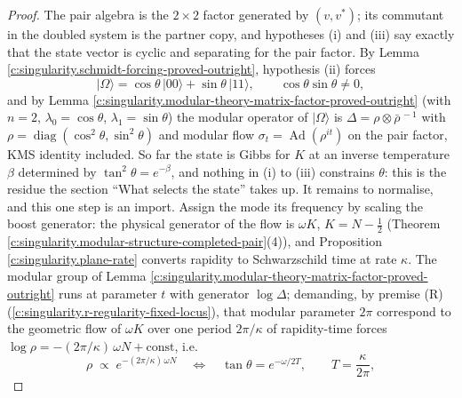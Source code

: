 \documentclass[11pt]{article}
\theoremstyle{definition}
\theoremstyle{plain}
\begin{document}
\begin{proof}
The pair algebra is the $2 \times 2$ factor generated by $(v, v^*)$; its commutant in the doubled system is the partner copy, and hypotheses (i) and (iii) say exactly that the state vector is cyclic and separating for the pair factor. By Lemma \ref{c:singularity.schmidt-forcing-proved-outright}, hypothesis (ii) forces
\[
|\Omega\rangle = \cos\theta\,|00\rangle + \sin\theta\,|11\rangle, \qquad \cos\theta\sin\theta \neq 0 ,
\]
and by Lemma \ref{c:singularity.modular-theory-matrix-factor-proved-outright} (with $n = 2$, $\lambda_0 = \cos\theta$, $\lambda_1 = \sin\theta$) the modular operator of $|\Omega\rangle$ is $\Delta = \rho \otimes \bar\rho^{\,-1}$ with $\rho = \operatorname{diag}(\cos^2\theta, \sin^2\theta)$ and modular flow $\sigma_t = \operatorname{Ad}(\rho^{it})$ on the pair factor, KMS identity included. So far the state is Gibbs for $K$ at an inverse temperature $\beta$ determined by $\tan^{2}\theta = e^{-\beta}$, and nothing in (i) to (iii) constrains $\theta$: this is the residue the section ``What selects the state'' takes up. It remains to normalise, and this one step is an import. Assign the mode its frequency by scaling the boost generator: the physical generator of the flow is $\omega K$, $K = N - \tfrac12$ (Theorem \ref{c:singularity.modular-structure-completed-pair}(4)), and Proposition \ref{c:singularity.plane-rate} converts rapidity to Schwarzschild time at rate $\kappa$. The modular group of Lemma \ref{c:singularity.modular-theory-matrix-factor-proved-outright} runs at parameter $t$ with generator $\log\Delta$; demanding, by premise (R) (\ref{c:singularity.r-regularity-fixed-locus}), that modular parameter $2\pi$ correspond to the geometric flow of $\omega K$ over one period $2\pi/\kappa$ of rapidity-time forces $\log\rho = -(2\pi/\kappa)\,\omega N + \text{const}$, i.e.
\[
\rho \;\propto\; e^{-(2\pi/\kappa)\,\omega N}
\quad\Longleftrightarrow\quad
\tan\theta = e^{-\omega/2T}, \qquad T = \frac{\kappa}{2\pi} ,
\]

\end{proof}
\end{document}
